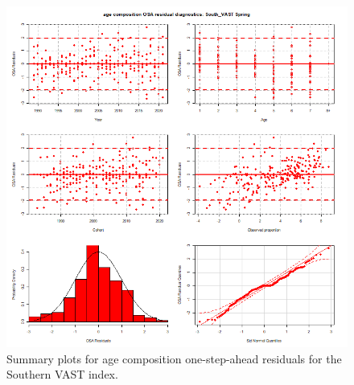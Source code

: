 \documentclass[
]{article}
\begin{document}
\begin{figure}

{\centering \includegraphics[width=1\linewidth]{../2023.RT.Runs/Run34/plots_png/diagnostics/OSA_resid_paa_6panel_South_VAST_Spring} 

}

\caption{Summary plots for age composition one-step-ahead residuals for the Southern VAST index.}\label{fig:osa-South-vast-paa-summ}
\end{figure}
\end{document}
